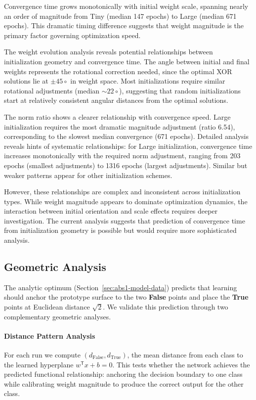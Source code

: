 Convergence time grows monotonically with initial weight scale, spanning nearly an order of magnitude from Tiny (median 147 epochs) to Large (median 671 epochs). This dramatic timing difference suggests that weight magnitude is the primary factor governing optimization speed.

The weight evolution analysis reveals potential relationships between initialization geometry and convergence time. The angle between initial and final weights represents the rotational correction needed, since the optimal XOR solutions lie at $\pm45\circ$ in weight space. Most initializations require similar rotational adjustments (median $\sim22\circ$), suggesting that random initializations start at relatively consistent angular distances from the optimal solutions.

The norm ratio shows a clearer relationship with convergence speed. Large initialization requires the most dramatic magnitude adjustment (ratio 6.54), corresponding to the slowest median convergence (671 epochs). Detailed analysis reveals hints of systematic relationships: for Large initialization, convergence time increases monotonically with the required norm adjustment, ranging from 203 epochs (smallest adjustments) to 1316 epochs (largest adjustments). Similar but weaker patterns appear for other initialization schemes.

However, these relationships are complex and inconsistent across initialization types. While weight magnitude appears to dominate optimization dynamics, the interaction between initial orientation and scale effects requires deeper investigation. The current analysis suggests that prediction of convergence time from initialization geometry is possible but would require more sophisticated analysis.


\subsection*{Geometric Analysis}

The analytic optimum (Section~\ref{sec:abs1-model-data}) predicts that learning should anchor the prototype surface to the two \textbf{False} points and place the \textbf{True} points at Euclidean distance $\sqrt{2}$. We validate this prediction through two complementary geometric analyses.

\paragraph{Distance Pattern Analysis}
For each run we compute $(d_{\text{False}}, d_{\text{True}})$, the mean distance from each class to the learned hyperplane $w^{\mathsf{T}}x + b = 0$. This tests whether the network achieves the predicted functional relationship: anchoring the decision boundary to one class while calibrating weight magnitude to produce the correct output for the other class.

